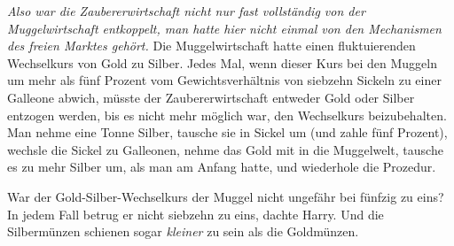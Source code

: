 \emph{Also war die Zaubererwirtschaft nicht nur fast vollständig von der Muggelwirtschaft entkoppelt, man hatte hier nicht einmal von den Mechanismen des freien Marktes gehört.} Die Muggelwirtschaft hatte einen fluktuierenden Wechselkurs von Gold zu Silber. Jedes Mal, wenn dieser Kurs bei den Muggeln um mehr als fünf Prozent vom Gewichtsverhältnis von siebzehn Sickeln zu einer Galleone abwich, müsste der Zaubererwirtschaft entweder Gold oder Silber entzogen werden, bis es nicht mehr möglich war, den Wechselkurs beizubehalten. Man nehme eine Tonne Silber, tausche sie in Sickel um (und zahle fünf Prozent), wechsle die Sickel zu Galleonen, nehme das Gold mit in die Muggelwelt, tausche es zu mehr Silber um, als man am Anfang hatte, und wiederhole die Prozedur.

War der Gold-Silber-Wechselkurs der Muggel nicht ungefähr bei fünfzig zu eins? In jedem Fall betrug er nicht siebzehn zu eins, dachte Harry. Und die Silbermünzen schienen sogar \emph{kleiner} zu sein als die Goldmünzen.

